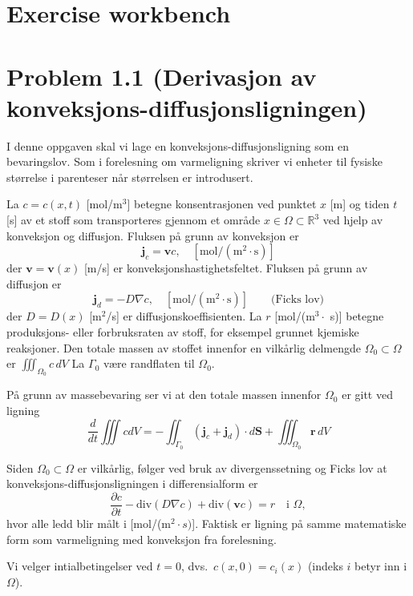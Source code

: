 
\section{Exercise workbench}

\section*{Problem 1.1 (Derivasjon av konveksjons-diffusjonsligningen)}

I denne oppgaven skal vi lage en konveksjons-diffusjonsligning som en bevaringslov. Som i forelesning om varmeligning skriver vi enheter til fysiske størrelse i parenteser når størrelsen er introdusert.

La \( c = c(x, t) \) [mol/m\(^3\)] betegne konsentrasjonen ved punktet \( x \) [m] og tiden \( t \) [s] av et stoff som transporteres gjennom et område \( x \in \Omega \subset \mathbb{R}^3 \) ved hjelp av konveksjon og diffusjon. Fluksen på grunn av konveksjon er
\[
\mathbf{j}_c = \mathbf{v}c, \quad [\text{mol}/(\text{m}^2\cdot\text{s})]
\]
der \( \mathbf{v} = \mathbf{v}(x) \) [m/s] er konveksjonshastighetsfeltet. Fluksen på grunn av diffusjon er 
\[
\mathbf{j}_d = -D \nabla c, \quad [\text{mol}/(\text{m}^2\cdot\text{s})] \qquad \text{(Ficks lov)}
\]
der \( D = D(x) \) [m\(^2\)/s] er diffusjonskoeffisienten. La \( r \) [mol/(m\(^3\cdot\) s)] betegne produksjons- eller forbruksraten av stoff, for eksempel grunnet kjemiske reaksjoner. Den totale massen av stoffet innenfor en vilkårlig delmengde \( \Omega_0 \subset \Omega \) er
\(\iiint_{\Omega_0} c\, dV\) La \(\Gamma_0\) være randflaten til \(\Omega_0\).

På grunn av massebevaring ser vi at den totale massen innenfor \(\Omega_0\) er gitt ved ligning
\[\frac{d}{dt} \iiint c dV  = - \iint_{\Gamma_0} (\mathbf{j}_c + \mathbf{j}_d)\cdot d\mathbf{S} + \iiint_{\Omega_0}\mathbf{r} \, dV\]

Siden \( \Omega_0 \subset \Omega \) er vilkårlig, følger ved bruk av divergenssetning og Ficks lov at konveksjons-diffusjonsligningen i differensialform er
\[
\frac{\partial c}{\partial t} - \text{div} (D \nabla c) + \text{div} (\mathbf{v} c) = r \quad \text{i } \Omega,
\]
hvor alle ledd blir målt i [mol/(m\(^2\cdot s)\)]. Faktisk er ligning på samme matematiske form som varmeligning med konveksjon fra forelesning.

Vi velger intialbetingelser ved \(t=0\), dvs.\ \(c(x,0)=c_i(x)\) (indeks \(i\) betyr inn i \(\Omega\)).

